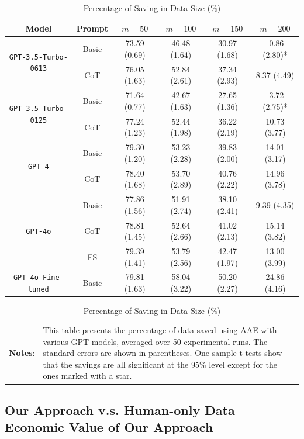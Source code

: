 \begin{table}[!t]
\renewcommand{\arraystretch}{1.3}
\centering
{\footnotesize
\caption{Percentage of Saving in Data Size (\%)}
\label{tab:saving}
\begin{tabular}{cccccc}\hline\hline
Model    & Prompt & $m=50$          & $m=100$         & $m=150$         &$m=200$         \\\hline
\multirow{2}{*}{\texttt{GPT-3.5-Turbo-0613}} & Basic & 73.59   (0.69) & 46.48 (1.64) & 30.97 (1.68) & -0.86 (2.80)* \\
 & CoT & 76.05 (1.63) & 52.84 (2.61) & 37.34 (2.93) & 8.37 (4.49) \\
\multirow{2}{*}{\texttt{GPT-3.5-Turbo-0125}} & Basic & 71.64 (0.77) & 42.67 (1.63) & 27.65 (1.36) & -3.72 (2.75)* \\
 & CoT & 77.24 (1.23) & 52.44 (1.98) & 36.22 (2.19) & 10.73 (3.77) \\
\multirow{2}{*}{\texttt{GPT-4}} & Basic & 79.30 (1.20) & 53.23 (2.28) & 39.83 (2.00) & 14.01 (3.17) \\
 & CoT & 78.40 (1.68) & 53.70 (2.89) & 40.76 (2.22) & 14.96 (3.78) \\
\multirow{3}{*}{\texttt{GPT-4o}} & Basic & 77.86 (1.56) & 51.91 (2.74) & 38.10 (2.41) & 9.39 (4.35) \\
 & CoT & 78.81 (1.45) & 52.64 (2.66) & 41.02 (2.13) & 15.14 (3.82) \\
 & FS & 79.39 (1.41) & 53.79 (2.56) & 42.47 (1.97) & 13.00 (3.99) \\
\texttt{GPT-4o Fine-tuned} & Basic & 79.81 (1.63) & 58.04 (3.22) & 50.20 (2.27) & 24.86 (4.16)       \\\hline\hline
\end{tabular}}
\begin{minipage}{15.5cm}
\vspace{3pt}
    \footnotesize
    \begin{tabular}{p{1cm} p{14cm}}
         \textbf{Notes}: & \setlength{\baselineskip}{1.2\baselineskip} 
    This table presents the percentage of data saved using AAE with various GPT models, averaged over 50 experimental runs. The standard errors are shown in parentheses. One sample t-tests show that the savings are all significant at the 95\% level except for the ones marked with a star.
    \end{tabular}
  \end{minipage}
\end{table}


\subsection{Our Approach v.s. Human-only Data---Economic Value of Our Approach } 
\label{sec:empirical-1-economic-value}



